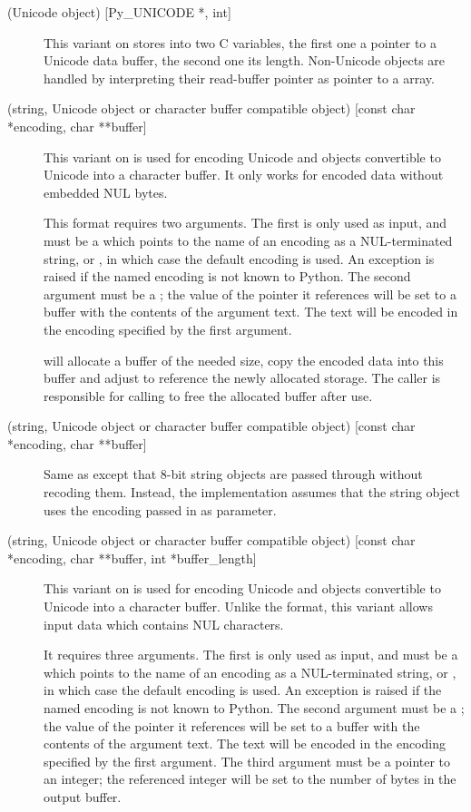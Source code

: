 \begin{description}
  \item[ (Unicode object) {[Py_UNICODE *, int]}]
  This variant on  stores into two C variables, the first one
  a pointer to a Unicode data buffer, the second one its length.
  Non-Unicode objects are handled by interpreting their read-buffer
  pointer as pointer to a  array.

  \item[ (string, Unicode object or character buffer
  compatible object) {[const char *encoding, char **buffer]}]
  This variant on  is used for encoding Unicode and objects
  convertible to Unicode into a character buffer. It only works for
  encoded data without embedded NUL bytes.

  This format requires two arguments.  The first is only used as
  input, and must be a  which points to the name of an
  encoding as a NUL-terminated string, or \NULL, in which case the
  default encoding is used.  An exception is raised if the named
  encoding is not known to Python.  The second argument must be a
  ; the value of the pointer it references will be set
  to a buffer with the contents of the argument text.  The text will
  be encoded in the encoding specified by the first argument.

   will allocate a buffer of the needed
  size, copy the encoded data into this buffer and adjust
   to reference the newly allocated storage.  The caller
  is responsible for calling  to free the
  allocated buffer after use.

  \item[ (string, Unicode object or character buffer
  compatible object) {[const char *encoding, char **buffer]}]
  Same as  except that 8-bit string objects are passed
  through without recoding them.  Instead, the implementation assumes
  that the string object uses the encoding passed in as parameter.

  \item[ (string, Unicode object or character buffer compatible
  object) {[const char *encoding, char **buffer, int *buffer_length]}]
  This variant on  is used for encoding Unicode and objects
  convertible to Unicode into a character buffer.  Unlike the
   format, this variant allows input data which contains NUL
  characters.

  It requires three arguments.  The first is only used as input, and
  must be a  which points to the name of an encoding as a
  NUL-terminated string, or \NULL, in which case the default encoding
  is used.  An exception is raised if the named encoding is not known
  to Python.  The second argument must be a ; the value
  of the pointer it references will be set to a buffer with the
  contents of the argument text.  The text will be encoded in the
  encoding specified by the first argument.  The third argument must
  be a pointer to an integer; the referenced integer will be set to
  the number of bytes in the output buffer.


\end{description}
